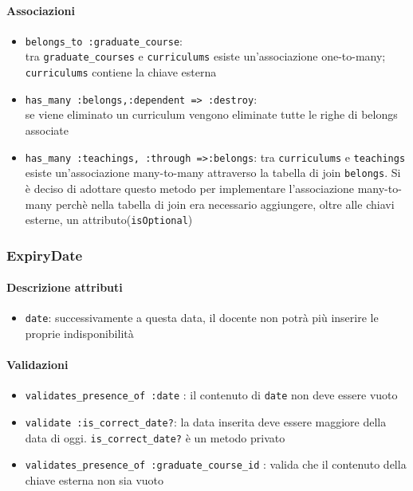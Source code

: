 \documentclass[11pt,a4paper]{article}
\begin{document}
\paragraph{Associazioni}
\begin{itemize}
 \item \verb|belongs_to :graduate_course|:\\ tra \verb|graduate_courses| e \verb|curriculums| esiste un'associazione one-to-many; \verb|curriculums| contiene la chiave esterna
 \item \verb|has_many :belongs,:dependent => :destroy|:\\ se viene eliminato un curriculum vengono eliminate tutte le righe di belongs associate
 \item \verb|has_many :teachings, :through =>:belongs|: tra \verb|curriculums| e \verb|teachings| esiste un'associazione many-to-many attraverso la tabella di join \verb|belongs|. Si è deciso di adottare questo metodo per implementare l'associazione many-to-many perchè nella tabella di join era necessario aggiungere, oltre alle chiavi esterne, un attributo(\verb|isOptional|) 		
\end{itemize}
\subsubsection{ExpiryDate}
\paragraph{Descrizione attributi}
\begin{itemize}
 \item \verb|date|: successivamente a questa data, il docente non potrà più inserire le proprie indisponibilità
\end{itemize}
\paragraph{Validazioni}
\begin{itemize}
 \item \verb|validates_presence_of :date| : il contenuto di \verb|date| non deve essere vuoto
 \item \verb|validate :is_correct_date?|: la data inserita deve essere maggiore della data di oggi. \verb|is_correct_date?| è un metodo privato
\item \verb|validates_presence_of :graduate_course_id| : valida che il contenuto della chiave esterna non sia vuoto
\end{itemize}
\end{document}
